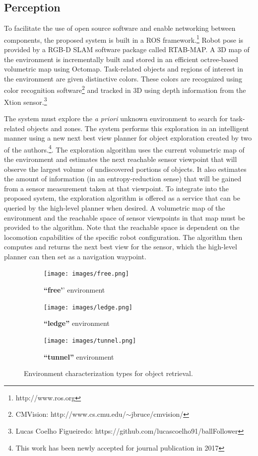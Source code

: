 \documentclass[conference]{IEEEtran}
\begin{document}
\subsection{Perception}
\label{sec:perception}
%
To facilitate the use of open source software and enable networking between components, the proposed system is built in a ROS framework.\footnote{http://www.ros.org} Robot pose is provided by a RGB-D SLAM software package called RTAB-MAP\cite{rtabmap}. A 3D map of the environment is incrementally built and stored in an efficient octree-based volumetric map using Octomap\cite{octomap}.  Task-related objects and regions of interest in the environment are given distinctive colors. These colors are recognized using color recognition software\footnote{CMVision: http://www.cs.cmu.edu/$\sim$jbruce/cmvision/} and tracked in 3D using depth information from the Xtion sensor.\footnote{Lucas Coelho Figueiredo: https://github.com/lucascoelho91/ballFollower}

The system must explore the \textit{a priori} unknown environment to search for task-related objects and zones. The system performs this exploration in an intelligent manner using a new next best view planner for object exploration created by two of the authors.\footnote{This work has been newly accepted for journal publication in 2017}. The exploration algorithm uses the current volumetric map of the environment and estimates the next reachable sensor viewpoint that will observe the largest volume of undiscovered portions of objects. It also estimates the amount of information (in an entropy-reduction sense) that will be gained from a sensor measurement taken at that viewpoint. To integrate into the proposed system, the exploration algorithm is offered as a service that can be queried by the high-level planner when desired. A volumetric map of the environment and the reachable space of sensor viewpoints in that map must be provided to the algorithm. Note that the reachable space is dependent on the locomotion capabilities of the specific robot configuration. The algorithm then computes and returns the next best view for the sensor, which the high-level planner can then set as a navigation waypoint.

\begin{figure}[t]
      \centering
      \begin{subfigure}[t]{0.15\textwidth}
        \texttt{[image: images/free.png]}
        \caption{\textbf{``free'}' environment}
    \end{subfigure}
    \begin{subfigure}[t]{0.15\textwidth}
        \texttt{[image: images/ledge.png]}
        \caption{\textbf{``ledge''} environment}
    \end{subfigure}
        \begin{subfigure}[t]{0.15\textwidth}
        \texttt{[image: images/tunnel.png]}
        \caption{\textbf{``tunnel''} environment}
    \end{subfigure}
      \caption{Environment characterization types for object retrieval.}
      \label{fig:characters}
   \end{figure}
\end{document}

